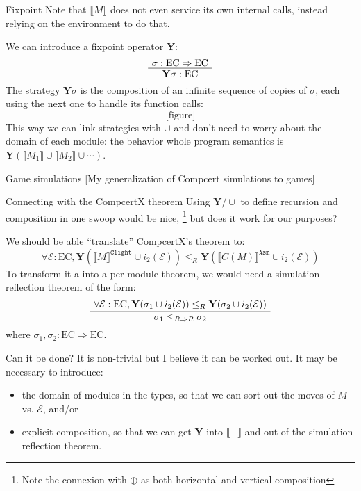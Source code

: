 \documentclass{beamer}
\newcommand{\EC}{\text{EC}}
\newcommand{\ECEC}{\EC \Rightarrow \EC}
\newcommand{\kw}[1]{\texttt{#1}}
\newcommand{\Y}{\mathbf{Y}}
\newcommand{\E}{\mathcal{E}}
\begin{document}
\begin{frame}{Fixpoint} %
Note that $\llbracket M \rrbracket$
does not even service its own internal calls,
instead relying on the environment to do that.

We can introduce a fixpoint operator $\Y$:
\[
	\AxiomC{$\sigma : \ECEC$}
	\UnaryInfC{$\Y \sigma : \EC$}
	\DisplayProof
\]
The strategy $\Y \sigma$ is the composition
of an infinite sequence of copies of $\sigma$,
each using the next one to handle its function calls:
\[ \text{[figure]} \]
This way we can link strategies with $\cup$
and don't need to worry about the domain of each module:
the behavior whole program semantics is $\Y ( \llbracket M_1 \rrbracket \cup \llbracket M_2 \rrbracket \cup \cdots )$.
\end{frame}

\begin{frame}{Game simulations} %
[My generalization of Compcert simulations to games]
\end{frame}

\begin{frame}{Connecting with the CompcertX theorem} %
Using $\Y/\cup$ to define recursion and composition in one swoop would be nice,%
\footnote{Note the connexion with $\oplus$ as both horizontal and vertical composition}
but does it work for our purposes?

We should be able ``translate'' CompcertX's theorem to:
\[
	\forall \E : \EC,
		\Y (\llbracket M \rrbracket^\kw{Clight} \cup i_2(\E)) \le_R
		\Y (\llbracket C(M) \rrbracket^\kw{Asm} \cup i_2(\E))
\]
To transform it a into a per-module theorem,
we would need a simulation reflection theorem of the form:
\[
	\AxiomC{$\forall \E : \EC, \Y (\sigma_1 \cup i_2(\E)) \le_R \Y (\sigma_2 \cup i_2(\E))$}
	\UnaryInfC{$\sigma_1 \le_{R \Rightarrow R} \sigma_2$}
	\DisplayProof
\]
where $\sigma_1, \sigma_2 : \ECEC$.
\end{frame}

\begin{frame}{Can it be done?} %
It is non-trivial but I believe it can be worked out.
It may be necessary to introduce:
\begin{itemize}
\item the domain of modules in the types,
	so that we can sort out the moves of $M$ vs. $\E$, and/or
\item explicit composition,
	so that we can get $\Y$ into $\llbracket - \rrbracket$ and
	out of the simulation reflection theorem.
\end{itemize}
\end{frame}
\end{document}
